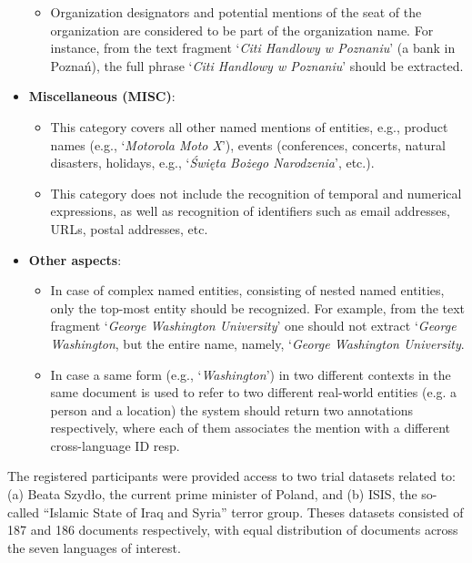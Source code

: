 \documentclass[11pt]{article}
\begin{document}
\begin{itemize}
\begin{itemize}
\item Organization designators and potential mentions of the seat of the organization are considered to be part of the organization name. For instance, from the text fragment `\textit{Citi Handlowy w Poznaniu}' (a bank in Poznań), the full phrase `\textit{Citi Handlowy w Poznaniu}' should be extracted.

\end{itemize}

\item \textbf{Miscellaneous (MISC)}:

\begin{itemize}

\item This category covers all other named mentions of entities, e.g., product names (e.g., `\textit{Motorola Moto X}'), events (conferences, concerts, natural disasters, holidays, e.g., `\textit{Święta Bożego Narodzenia}', etc.).

\item This category does not include the recognition of temporal and numerical expressions, as well as recognition of identifiers such as email addresses, URLs, postal addresses, etc.

\end{itemize}

\item \textbf{Other aspects}:

\begin{itemize}

\item In case of complex named entities, consisting of nested named entities, only the top-most entity should be recognized. For example, from the text fragment `\textit{George Washington University}' one should not extract `\textit{George Washington}, but the entire name, namely, `\textit{George Washington University}. 

\item In case a same form (e.g., `\textit{Washington}') in two different contexts in the same document is used to refer to two different real-world entities (e.g. a person and a location) the system should return two annotations respectively, where each of them associates the mention with a different cross-language ID resp.

\end{itemize}

\end{itemize}

The registered participants were provided access to two trial datasets related to: (a) Beata Szydło, the current prime minister of Poland, and (b) ISIS, the so-called “Islamic State of Iraq and Syria” terror group. Theses datasets consisted of 187 and 186 documents respectively, with equal distribution of documents across the seven languages of interest.
\end{document}
